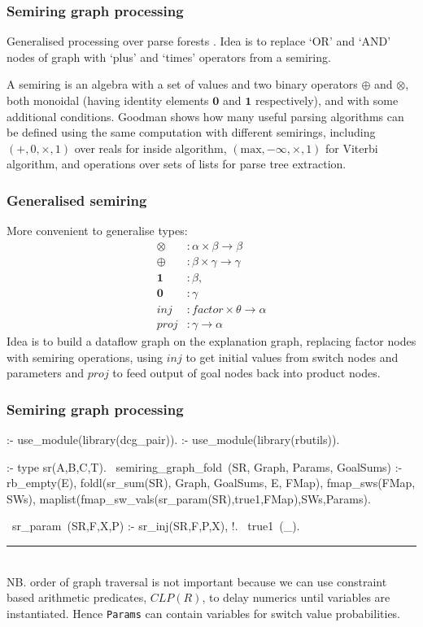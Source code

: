 \documentclass[usenames,dvipsnames]{beamer}
\newenvironment{isframe}[1][untitled]{\begin{frame}[fragile=singleslide,environment=isframe]\frametitle{#1}}{\end{frame}}
\def\pl#1{\lstinline[language={[SWI]Prolog},columns=fullflexible]{#1}}
\begin{document}
\begin{isframe}[Semiring graph processing]
Generalised processing over parse forests \citep{Goodman1998,Goodman1999}.
Idea is to replace `OR' and `AND' nodes of graph with 
`plus' and `times' operators from a semiring.

A semiring is an algebra with a set of values and two binary operators
$\oplus$ and $\otimes$, both monoidal (having identity elements $\mathbf{0}$ and $\mathbf{1}$ respectively),
and with some additional conditions. Goodman shows how many useful parsing 
algorithms can be defined using the same computation with different semirings,
including $(+,0,\times,1)$ over reals for inside algorithm, $(\mathrm{max},-\infty,\times,1)$
for Viterbi algorithm, and operations over sets of lists for parse tree extraction.
\end{isframe}

\begin{isframe}[Generalised semiring]
More convenient to generalise types:
\begin{align*}
  \otimes &: \alpha \times \beta \to \beta \\
  \oplus &: \beta \times \gamma \to \gamma \\
  \mathbf{1} &: \beta,\\
  \mathbf{0} &: \gamma\\
  \mathit{inj} &: \mathit{factor} \times \theta \to \alpha\\
  \mathit{proj} &: \gamma \to \alpha
\end{align*}
Idea is to build a dataflow graph on the explanation graph, replacing 
factor nodes with semiring operations, using $\mathit{inj}$ to get initial
values from switch nodes and parameters and $\mathit{proj}$ to feed output of goal nodes
back into product nodes.
\end{isframe}

\begin{isframe}[Semiring graph processing]
\begin{prolog}[xleftmargin=0em,basicstyle=\small]
  :- use_module(library(dcg_pair)).
  :- use_module(library(rbutils)).

  :- type sr(A,B,C,T). %
  ~semiring_graph_fold~(SR, Graph, Params, GoalSums) :-
     rb_empty(E),
     foldl(sr_sum(SR), Graph, GoalSums, E, FMap),
     fmap_sws(FMap, SWs),
     maplist(fmap_sw_vals(sr_param(SR),true1,FMap),SWs,Params).

  ~sr_param~(SR,F,X,P) :- sr_inj(SR,F,P,X), !.
  ~true1~(_).
\end{prolog}
\vspace{-1.5em}
\rule{\linewidth}{0.4pt}\\
NB. order of graph traversal is not important because we can use constraint based arithmetic
predicates, \eg $\mathit{CLP}(R)$, to delay numerics until variables are instantiated. Hence
\pl{Params} can contain variables for switch value probabilities.
\end{isframe}
\end{document}
